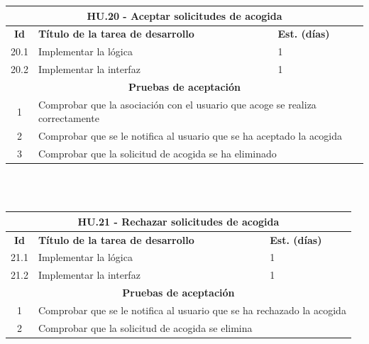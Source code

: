 \begin{tabular}{|c|p{9.5cm}|p{1cm}|}
	\hline
	\multicolumn{3}{|c|}{\textbf{HU.20 - Aceptar solicitudes de acogida}} \\
	\hline
	\textbf{Id} & \textbf{Título de la tarea de desarrollo} & \textbf{Est. (días)} \\
	\hline
	20.1 &  Implementar la lógica & 1 \\ \hline
	20.2 &  Implementar la interfaz & 1 \\ \hline
	\multicolumn{3}{|c|}{\textbf{Pruebas de aceptación}} \\ \hline
	1 & \multicolumn{2}{|p{12cm}|}{Comprobar que la asociación con el usuario que acoge se realiza correctamente} \\ \hline
	2 & \multicolumn{2}{|p{12cm}|}{Comprobar que se le notifica al usuario que se ha aceptado la acogida} \\ \hline
	3 & \multicolumn{2}{|p{12cm}|}{Comprobar que la solicitud de acogida se ha eliminado} \\ \hline
	
	
\end{tabular} \\ \\


\begin{tabular}{|c|p{9.5cm}|p{1cm}|}
	\hline
	\multicolumn{3}{|c|}{\textbf{HU.21 - Rechazar solicitudes de acogida}} \\
	\hline
	\textbf{Id} & \textbf{Título de la tarea de desarrollo} & \textbf{Est. (días)} \\
	\hline
	21.1 &  Implementar la lógica & 1 \\ \hline
	21.2 &  Implementar la interfaz & 1 \\ \hline
	\multicolumn{3}{|c|}{\textbf{Pruebas de aceptación}} \\ \hline
	1 & \multicolumn{2}{|p{12cm}|}{Comprobar que se le notifica al usuario que se ha rechazado la acogida} \\ \hline
	2 & \multicolumn{2}{|p{12cm}|}{Comprobar que la solicitud de acogida se elimina} \\ \hline
	
\end{tabular} \\ \\

